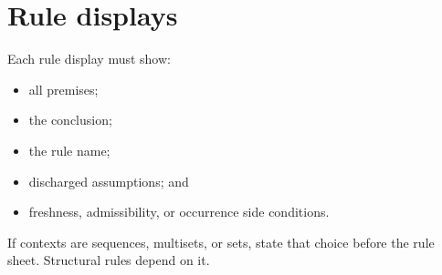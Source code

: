 \section{Rule displays}
\label{sec:latex-style-04}

Each rule display must show:
\begin{itemize}
  \item all premises;
  \item the conclusion;
  \item the rule name;
  \item discharged assumptions; and
  \item freshness, admissibility, or occurrence side conditions.
\end{itemize}
If contexts are sequences, multisets, or sets, state that choice before the
rule sheet.  Structural rules depend on it.

